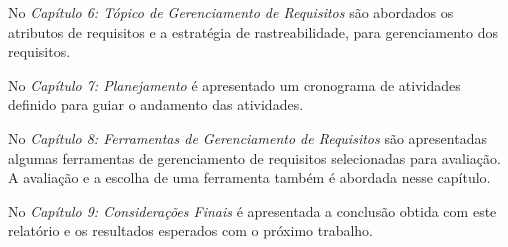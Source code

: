 No \textit{Capítulo 6: Tópico de Gerenciamento de Requisitos} são abordados
os atributos de requisitos e a estratégia de rastreabilidade, para gerenciamento
dos requisitos.

No \textit{Capítulo 7: Planejamento} é apresentado um cronograma de atividades
definido para guiar o andamento das atividades.

No \textit{Capítulo 8: Ferramentas de Gerenciamento de Requisitos} são apresentadas
algumas ferramentas de gerenciamento de requisitos selecionadas para avaliação. 
A avaliação e a escolha de uma ferramenta também é abordada nesse capítulo.

No \textit{Capítulo 9: Considerações Finais} é apresentada a conclusão obtida
com este relatório e os resultados esperados com o próximo trabalho.